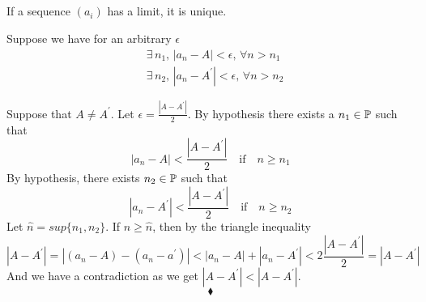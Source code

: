 \subsection{}
\begin{tcolorbox}
If a sequence $(a_i)$ has a limit, it is unique.
\end{tcolorbox}
Suppose we have for an arbitrary $\epsilon$
\begin{align*}
&\exists\, n_1,\, |a_n-A|<\epsilon,\, \forall n>n_1\\
&\exists\, n_2,\, |a_n-A^{'}|<\epsilon,\, \forall n>n_2
\end{align*}

Suppose that $A \neq A^{'}$. Let $\epsilon = \frac{|A - A^{'}|}{2} $. By hypothesis there exists a $n_1 \in \mathbb{P}$ such that 
$$
|a_n - A| <\frac{|A - A^{'}|}{2} \quad \text{if} \quad n \geq n_1 
$$ 
By hypothesis, there exists $n_2 \in \mathbb{P}$ such that 
$$
|a_n - A^{'}|<\frac{|A - A^{'}|}{2} \quad \text{if} \quad n \geq n_2 
$$
Let $\hat{n} = sup\{n_1,n_2\}$. If $n \geq \hat{n}$, then by the triangle inequality
$$
|A - A^{'}| = |(a_n - A) - (a_n - a^{'})| <|a_ n - A| + |a_n - A^{'}| < 2 \frac{|A - A^{'}|}{2} = |A - A^{'}|
$$
And we have a contradiction as we get $
|A - A^{'}| <|A - A^{'}|
$.
$$\blacklozenge$$
\newpage


\renewcommand{\thesubsection}{\thesection.\arabic{subsection}}
\setcounter{subsection}{0}

